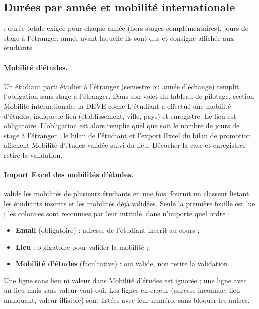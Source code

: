 \documentclass[11pt,a4paper]{article}
\begin{document}
\subsection{Durées par année et mobilité internationale}
\label{sec:durees}

 : durée totale
exigée pour chaque année (hors stages complémentaires), jours de stage à
l'étranger, année avant laquelle ils sont dus et consigne affichée aux
étudiants.


\paragraph{Mobilité d'études.} Un étudiant parti étudier à l'étranger
(semestre ou année d'échange) remplit l'obligation sans stage à l'étranger.
Dans son volet du tableau de pilotage, section \og Mobilité internationale\fg{},
la DEVE coche \og L'étudiant a effectué une mobilité d'études\fg{}, indique le
lieu (établissement, ville, pays) et enregistre. Le lieu est obligatoire.
L'obligation est alors remplie quel que soit le nombre de jours de stage à
l'étranger ; le bilan de l'étudiant et l'export Excel du bilan de promotion
affichent \og Mobilité d'études validée\fg{} suivi du lieu. Décocher la case et
enregistrer retire la validation.

\paragraph{Import Excel des mobilités d'études.}
 valide les
mobilités de plusieurs étudiants en une fois. 
fournit un classeur listant les étudiants inscrits et les mobilités déjà
validées. Seule la première feuille est lue ; les colonnes sont reconnues par
leur intitulé, dans n'importe quel ordre :
\begin{itemize}
  \item \textbf{Email} (obligatoire) : adresse de l'étudiant inscrit au cours ;
  \item \textbf{Lieu} : obligatoire pour valider la mobilité ;
  \item \textbf{Mobilité d'études} (facultative) : \og oui\fg{} valide,
        \og non\fg{} retire la validation.
\end{itemize}
Une ligne sans lieu ni valeur dans \og Mobilité d'études\fg{} est ignorée ; une
ligne avec un lieu mais sans valeur vaut \og oui\fg{}. Les lignes en erreur
(adresse inconnue, lieu manquant, valeur illisible) sont listées avec leur
numéro, sans bloquer les autres.
\end{document}
